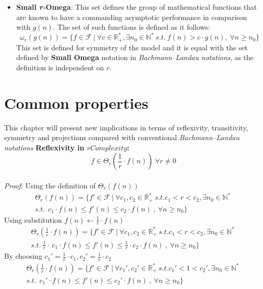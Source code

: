 \begin{itemize}
  \item \textbf{Small \textit{r-}Omega}:
  This set defines the group of mathematical functions that are known to have a commanding asymptotic performance in comparison with  $g(n)$.
  The set of such functions is defined as it follows:
  \[\omega_{r}(g(n)) = \lbrace f \in \mathcal{F}\ |\ \forall c \in \mathbb{R}^{*}_{+}, \exists n_{0} \in \mathbb{N}^{*}\ s.t.\  f(n) > c \cdot g(n),\  \forall n \geq n_{0} \rbrace\]
    This set is defined for symmetry of the model and it is equal with the set defined by \textbf{Small Omega} notation in \textit{Bachmann–Landau notations}, as the definition is independent on $r$.
\end{itemize}

\section{Common properties}
This chapter will present new implications in terms of reflexivity, transitivity, symmetry and projections compared with conventional \textit{Bachmann–Landau notations}
 \hfill\break
 \textbf{Reflexivity in $rComplexity$:}  \[ f \in \Theta_{r} \left( \frac{1}{r} \cdot f(n) \right)\ \forall r \neq 0 \]
   \\\textit{Proof}:
    Using the definition of $ \Theta_{r}(f(n))$
    \[\begin{split} \Theta_{r}(f(n)) = \lbrace f' \in \mathcal{F}\ |\ \forall c_{1}, c_{2} \in \mathbb{R}^{*}_{+} \ s.t.  c_{1}< r < c_{2} , \exists n_{0} \in \mathbb{N}^{*}\ \\ s.t.\ \ c_{1} \cdot f(n) \leq f'(n) \leq c_{2} \cdot f(n)\ ,\  \forall n \geq n_{0} \rbrace \end{split} \]
    Using substitution $ f(n) \longleftarrow \frac{1}{r} \cdot f(n)$
    \[\begin{split} \Theta_{r} \left( \frac{1}{r} \cdot f(n) \right) = \lbrace f' \in \mathcal{F}\ |\ \forall c_{1}, c_{2} \in \mathbb{R}^{*}_{+} \ s.t.  c_{1}< r < c_{2} , \exists n_{0} \in \mathbb{N}^{*}\ \\ s.t.\ \frac{1}{r} \cdot \ c_{1} \cdot f(n) \leq  f'(n) \leq \frac{1}{r} \cdot c_{2} \cdot f(n)\ ,\  \forall n \geq n_{0} \rbrace \end{split} \]
    By choosing $c_{1}' = \frac{1}{r} \cdot c_{1}, c_{2}' = \frac{1}{r} \cdot c_{2}$
   \[\begin{split} \Theta_{r} \left( \frac{1}{r} \cdot f(n) \right) = \lbrace f' \in \mathcal{F}\ |\ \forall c_{1}', c_{2}' \in \mathbb{R}^{*}_{+} \ s.t.  c_{1}'< 1 < c_{2}' , \exists n_{0} \in \mathbb{N}^{*}\ \\ s.t.\  \ c_{1}' \cdot f(n) \leq  f'(n) \leq c_{2}' \cdot f(n)\ ,\  \forall n \geq n_{0} \rbrace \end{split} \]
